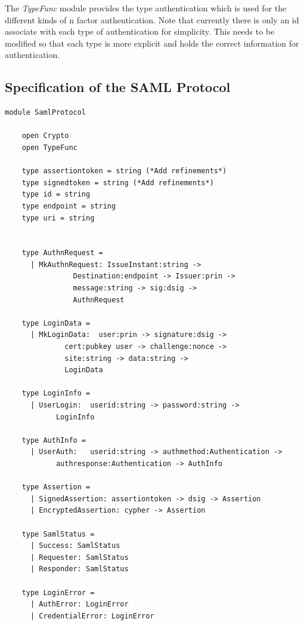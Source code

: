 \documentclass[twosided]{report}
\begin{document}
The \emph{TypeFunc} module provides the type authentication which is used for the different kinds of n factor authentication. Note that currently there is only an id associate with each type of authentication for simplicity. This needs to be modified so that each type is more explicit and holds the correct information for authentication.
\subsection{Specification of the SAML Protocol}

\begin{lstlisting}[style=fstar, caption={Specification of the SAML Protocol elements}]
	module SamlProtocol
	
	open Crypto
	open TypeFunc

	type assertiontoken = string (*Add refinements*)
	type signedtoken = string (*Add refinements*)
	type id = string
	type endpoint = string
	type uri = string


	type AuthnRequest = 
	  | MkAuthnRequest: IssueInstant:string ->
			    Destination:endpoint -> Issuer:prin ->
			    message:string -> sig:dsig ->
			    AuthnRequest

	type LoginData = 
	  | MkLoginData:  user:prin -> signature:dsig ->
			  cert:pubkey user -> challenge:nonce ->
			  site:string -> data:string ->
			  LoginData

	type LoginInfo =
	  | UserLogin:  userid:string -> password:string ->
			LoginInfo

	type AuthInfo =
	  | UserAuth:   userid:string -> authmethod:Authentication ->
			authresponse:Authentication -> AuthInfo

	type Assertion =
	  | SignedAssertion: assertiontoken -> dsig -> Assertion
	  | EncryptedAssertion: cypher -> Assertion

	type SamlStatus =
	  | Success: SamlStatus
	  | Requester: SamlStatus
	  | Responder: SamlStatus

	type LoginError =
	  | AuthError: LoginError
	  | CredentialError: LoginError


\end{lstlisting}
\end{document}
